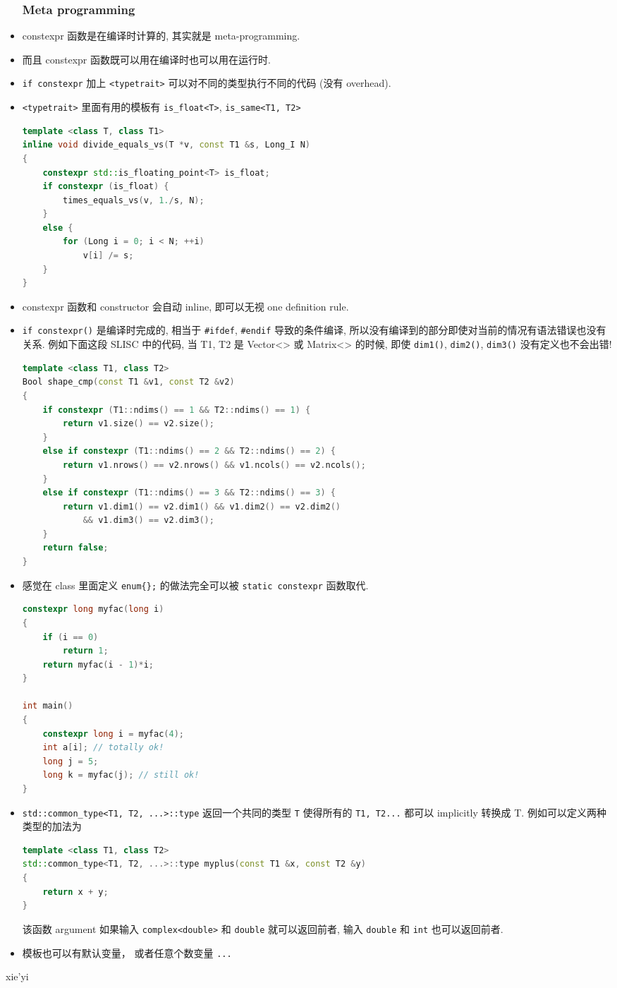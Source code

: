 \begin{itemize}
\subsubsection{Meta programming}
\item constexpr 函数是在编译时计算的, 其实就是 meta-programming.
\item 而且 constexpr 函数既可以用在编译时也可以用在运行时.
\item \verb`if constexpr` 加上 \verb`<typetrait>` 可以对不同的类型执行不同的代码 (没有 overhead).
\item \verb`<typetrait>` 里面有用的模板有 \verb`is_float<T>`, \verb`is_same<T1, T2>`
\begin{lstlisting}[language=cpp]
template <class T, class T1>
inline void divide_equals_vs(T *v, const T1 &s, Long_I N)
{
	constexpr std::is_floating_point<T> is_float;
	if constexpr (is_float) {
		times_equals_vs(v, 1./s, N);
	}
	else {
		for (Long i = 0; i < N; ++i)
			v[i] /= s;
	}
}
\end{lstlisting}
\item constexpr 函数和 constructor 会自动 inline, 即可以无视 one definition rule.
\item \verb`if constexpr()` 是编译时完成的, 相当于 \verb`#ifdef`, \verb`#endif` 导致的条件编译, 所以没有编译到的部分即使对当前的情况有语法错误也没有关系. 例如下面这段 SLISC 中的代码, 当 T1, T2 是 Vector<> 或 Matrix<> 的时候, 即使 \verb`dim1()`, \verb`dim2()`, \verb`dim3()` 没有定义也不会出错!
\begin{lstlisting}[language=cpp]
template <class T1, class T2>
Bool shape_cmp(const T1 &v1, const T2 &v2)
{
	if constexpr (T1::ndims() == 1 && T2::ndims() == 1) {
		return v1.size() == v2.size();
	}
	else if constexpr (T1::ndims() == 2 && T2::ndims() == 2) {
		return v1.nrows() == v2.nrows() && v1.ncols() == v2.ncols();
	}
	else if constexpr (T1::ndims() == 3 && T2::ndims() == 3) {
		return v1.dim1() == v2.dim1() && v1.dim2() == v2.dim2()
			&& v1.dim3() == v2.dim3();
	}
	return false;
}
\end{lstlisting}
\item 感觉在 class 里面定义 \verb`enum{};` 的做法完全可以被 \verb`static constexpr` 函数取代.
\begin{lstlisting}[language=cpp]
constexpr long myfac(long i)
{
	if (i == 0)
		return 1;
	return myfac(i - 1)*i;
}

int main()
{
	constexpr long i = myfac(4);
	int a[i]; // totally ok!
	long j = 5;
	long k = myfac(j); // still ok!
}
\end{lstlisting}
\item \verb`std::common_type<T1, T2, ...>::type` 返回一个共同的类型 \verb`T` 使得所有的 \verb`T1, T2...` 都可以 implicitly 转换成 T. 例如可以定义两种类型的加法为
\begin{lstlisting}[language=cpp]
template <class T1, class T2>
std::common_type<T1, T2, ...>::type myplus(const T1 &x, const T2 &y)
{
	return x + y;
}
\end{lstlisting}
该函数 argument 如果输入 \verb`complex<double>` 和 \verb`double` 就可以返回前者, 输入 \verb`double` 和 \verb`int` 也可以返回前者.
\item 模板也可以有默认变量， 或者任意个数变量 \verb|...|
\end{itemize}

xie'yi
